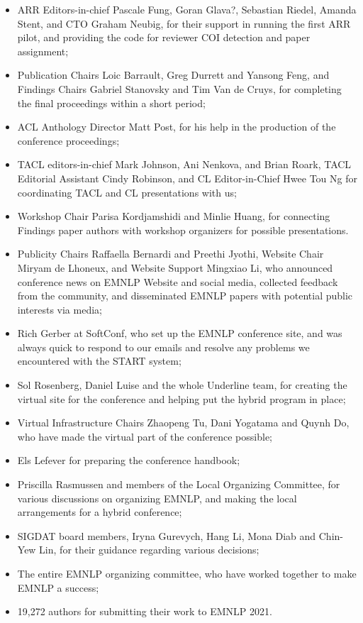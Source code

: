 \begin{itemize}
\item ARR Editors-in-chief Pascale Fung, Goran Glava?, Sebastian Riedel, Amanda Stent, and CTO Graham Neubig, for their support in running the first ARR pilot, and providing the code for reviewer COI detection and paper assignment;
\item Publication Chairs Loic Barrault, Greg Durrett and Yansong Feng, and Findings Chairs Gabriel Stanovsky and Tim Van de Cruys, for completing the final proceedings within a short period;
\item ACL Anthology Director Matt Post, for his help in the production of the conference proceedings;
\item TACL editors-in-chief Mark Johnson, Ani Nenkova, and Brian Roark, TACL Editorial Assistant Cindy Robinson, and CL Editor-in-Chief Hwee Tou Ng for coordinating TACL and CL presentations with us;
\item Workshop Chair Parisa Kordjamshidi and Minlie Huang, for connecting Findings paper authors with workshop organizers for possible presentations.
\item Publicity Chairs Raffaella Bernardi and Preethi Jyothi, Website Chair Miryam de Lhoneux, and Website Support Mingxiao Li, who announced conference news on EMNLP Website and social media, collected feedback from the community, and disseminated EMNLP papers with potential public interests via media;
\item Rich Gerber at SoftConf, who set up the EMNLP conference site, and was always quick to respond to our emails and resolve any problems we encountered with the START system;
\item Sol Rosenberg, Daniel Luise and the whole Underline team, for creating the virtual site for the conference and helping put the hybrid program in place;
\item Virtual Infrastructure Chairs Zhaopeng Tu, Dani Yogatama and Quynh Do, who have made the virtual part of the conference possible;
\item Els Lefever for preparing the conference handbook;
\newpage
\item Priscilla Rasmussen and members of the Local Organizing Committee, for various discussions on organizing EMNLP, and making the local arrangements for a hybrid conference;
\item SIGDAT board members, Iryna Gurevych, Hang Li, Mona Diab and Chin-Yew Lin, for their guidance regarding various decisions;
\item The entire EMNLP organizing committee, who have worked together to make EMNLP a success;
\item 19,272 authors for submitting their work to EMNLP 2021.

\end{itemize}

